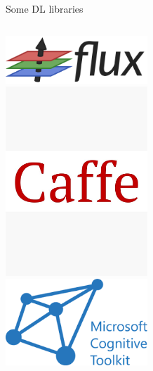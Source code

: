 \documentclass[notes, ignorenonframetext, compress, 10pt, xcolor=svgnames, aspectratio=169]{beamer}
\begin{document}
\begin{frame}[allowframebreaks]{Some DL libraries}
\begin{columns}[T]
    \hfill%
    \begin{column}{.5\textwidth}
        \begin{center}
 \includegraphics[width=0.4\textwidth]{../../Ressources/Figs/Fig_FluxLogo.png}\\
  \includegraphics[width=0.4\textwidth]{../../Ressources/Figs/Fig_CaffeLogo.jpeg}\\
  \includegraphics[width=0.4\textwidth]{../../Ressources/Figs/Fig_CNTKLogo.png}
  \end{center}
    \end{column}
  \end{columns}
\end{frame}
\end{document}

